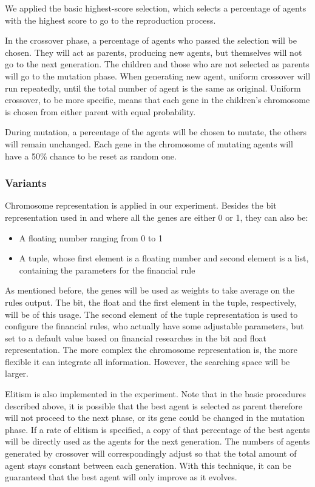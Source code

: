 \documentclass{article}
\begin{document}
We applied the basic highest-score selection,
which selects a percentage of agents with the highest score to go to the reproduction process.

In the crossover phase, a percentage of agents who passed the selection will be chosen.
They will act as parents, producing new agents, but themselves will not go to the next generation.
The children and those who are not selected as parents will go to the mutation phase.
When generating new agent, uniform crossover will run repeatedly,
until the total number of agent is the same as original.
Uniform crossover, to be more specific, means that each gene in the children's chromosome
is chosen from either parent with equal probability.

During mutation, a percentage of the agents will be chosen to mutate,
the others will remain unchanged.
Each gene in the chromosome of mutating agents will have a 50\% chance to be reset as random one.

\subsubsection{Variants}\label{subsubsec-variants}

Chromosome representation\cite{genetic-algorithm-review-and-application} is applied in our experiment.
Besides the bit representation used in \cite{genetic-algorithms-for-predicting-the-egyptian-stock-market}
and \cite{stock-timing-using-genetic-algorithms}
where all the genes are either 0 or 1,
they can also be:
\begin{itemize}
	\item A floating number ranging from 0 to 1
	\item A tuple, whose first element is a floating number and second element is a list,
	containing the parameters for the financial rule
\end{itemize}

As mentioned before, the genes will be used as weights to take average on the rules output.
The bit, the float and the first element in the tuple, respectively, will be of this usage.
The second element of the tuple representation is used to configure the financial rules,
who actually have some adjustable parameters, but set to a default value based on financial researches
in the bit and float representation.
The more complex the chromosome representation is, the more flexible it can integrate all information.
However, the searching space will be larger.

Elitism is also implemented in the experiment.
Note that in the basic procedures described above,
it is possible that the best agent is selected as parent therefore will not proceed to the next phase,
or its gene could be changed in the mutation phase.
If a rate of elitism is specified, a copy of that percentage of the best agents will be directly used
as the agents for the next generation.
The numbers of agents generated by crossover will correspondingly adjust so that the total amount of
agent stays constant between each generation.
With this technique, it can be guaranteed that the best agent will only improve as it evolves.
\end{document}

